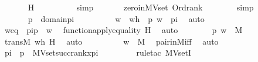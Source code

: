 \begin{isabellebody}
\ \ \ \ \ \isamarkupfalse%
\ H\ \isanewline
\ \ \ \ \ \ \ \isamarkupfalse%
\ simp\isanewline
\ \ \ \ \ \isamarkupfalse%
\ zero{\isacharunderscore}{\kern0pt}in{\isacharunderscore}{\kern0pt}MVset\ Ord{\isacharunderscore}{\kern0pt}rank\isanewline
\ \ \ \ \ \ \isamarkupfalse%
\ simp\ \isanewline
\ \ \ \isamarkupfalse%
\ {\isacharminus}{\kern0pt}\ \isanewline
\ \ \ \ \ \isamarkupfalse%
\ {\isachardoublequoteopen}p\ {\isasymin}\ domain{\isacharparenleft}{\kern0pt}pi{\isacharparenright}{\kern0pt}{\isachardoublequoteclose}\ \isanewline
\ \ \ \ \ \isamarkupfalse%
\ \isamarkupfalse%
\ w\ \ wh\ {\isacharcolon}{\kern0pt}\ {\isachardoublequoteopen}{\isacharless}{\kern0pt}p{\isacharcomma}{\kern0pt}\ w{\isachargreater}{\kern0pt}\ {\isasymin}\ pi{\isachardoublequoteclose}\ \isamarkupfalse%
\ auto\ \isanewline
\ \ \ \ \ \isamarkupfalse%
\ \isamarkupfalse%
\ weq\ {\isacharcolon}{\kern0pt}\ {\isachardoublequoteopen}pi{\isacharbackquote}{\kern0pt}p\ {\isacharequal}{\kern0pt}\ w{\isachardoublequoteclose}\ \isamarkupfalse%
\ function{\isacharunderscore}{\kern0pt}apply{\isacharunderscore}{\kern0pt}equality\ H\ \isamarkupfalse%
\ auto\ \isanewline
\ \ \ \ \ \isamarkupfalse%
\ {\isachardoublequoteopen}{\isacharless}{\kern0pt}p{\isacharcomma}{\kern0pt}\ w{\isachargreater}{\kern0pt}\ {\isasymin}\ M{\isachardoublequoteclose}\ \isamarkupfalse%
\ transM\ wh\ H\ \isamarkupfalse%
\ auto\ \isanewline
\ \ \ \ \ \isamarkupfalse%
\ \isamarkupfalse%
\ {\isachardoublequoteopen}w\ {\isasymin}\ M{\isachardoublequoteclose}\ \isamarkupfalse%
\ pair{\isacharunderscore}{\kern0pt}in{\isacharunderscore}{\kern0pt}M{\isacharunderscore}{\kern0pt}iff\ \isamarkupfalse%
\ auto\ \isanewline
\ \ \ \ \ \isamarkupfalse%
\ \isamarkupfalse%
\ {\isachardoublequoteopen}pi\ {\isacharbackquote}{\kern0pt}\ p\ {\isasymin}\ MVset{\isacharparenleft}{\kern0pt}succ{\isacharparenleft}{\kern0pt}rank{\isacharparenleft}{\kern0pt}x{\isacharunderscore}{\kern0pt}pi{\isacharparenright}{\kern0pt}{\isacharparenright}{\kern0pt}{\isacharparenright}{\kern0pt}{\isachardoublequoteclose}\isanewline
\ \ \ \ \ \ \ \isamarkupfalse%
\ {\isacharparenleft}{\kern0pt}rule{\isacharunderscore}{\kern0pt}tac\ MVsetI{\isacharparenright}{\kern0pt}\isanewline

\end{isabellebody}
